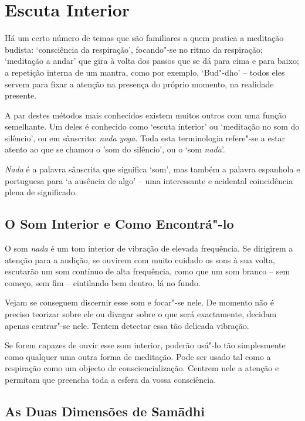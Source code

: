 \chapter{Escuta Interior}

Há um certo número de temas que são familiares a quem pratica a
meditação budista: `consciência da respiração', focando"-se no ritmo da
respiração; `meditação a andar' que gira à volta dos passos que se dá
para cima e para baixo; a repetição interna de um mantra, como por
exemplo, `Bud"-dho' -- todos eles servem para fixar a atenção na presença
do próprio momento, na realidade presente.

A par destes métodos mais conhecidos existem muitos outros com uma
função semelhante. Um deles é conhecido como `escuta interior' ou
`meditação no som do silêncio', ou em sânscrito: \emph{nada yoga}. Toda
esta terminologia refere"-se a estar atento ao que se chamou o 'som do
silêncio', ou o `som \emph{nada}'.

\emph{Nada} é a palavra sânscrita que significa `som', mas também a palavra
espanhola e portuguesa para `a ausência de algo' -- uma interessante e acidental
coincidência plena de significado.

\section{O Som Interior e Como Encontrá"-lo}

O som \emph{nada} é um tom interior de vibração de elevada frequência.
Se dirigirem a atenção para a audição, se ouvirem com muito cuidado os
sons à sua volta, escutarão um som contínuo de alta frequência, como que
um som branco -- sem começo, sem fim -- cintilando bem dentro, lá no
fundo.

Vejam se conseguem discernir esse som e focar"-se nele. De momento não é
preciso teorizar sobre ele ou divagar sobre o que será exactamente,
decidam apenas centrar"-se nele. Tentem detectar essa tão delicada
vibração.

Se forem capazes de ouvir esse som interior, poderão usá"-lo tão
simplesmente como qualquer uma outra forma de meditação. Pode ser usado
tal como a respiração como um objecto de consciencialização. Centrem
nele a atenção e permitam que preencha toda a esfera da vossa
consciência.

\section{As Duas Dimensões de Samādhi}

